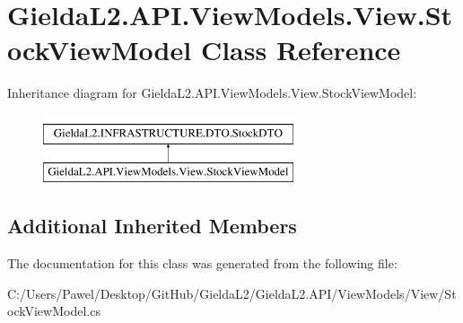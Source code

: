 \hypertarget{class_gielda_l2_1_1_a_p_i_1_1_view_models_1_1_view_1_1_stock_view_model}{}\section{Gielda\+L2.\+A\+P\+I.\+View\+Models.\+View.\+Stock\+View\+Model Class Reference}
\label{class_gielda_l2_1_1_a_p_i_1_1_view_models_1_1_view_1_1_stock_view_model}
Inheritance diagram for Gielda\+L2.\+A\+P\+I.\+View\+Models.\+View.\+Stock\+View\+Model\+:\begin{figure}[H]
\begin{center}
\leavevmode
\includegraphics[height=2.000000cm]{class_gielda_l2_1_1_a_p_i_1_1_view_models_1_1_view_1_1_stock_view_model}
\end{center}
\end{figure}
\subsection*{Additional Inherited Members}


The documentation for this class was generated from the following file\+:\begin{DoxyCompactItemize}
\item 
C\+:/\+Users/\+Pawel/\+Desktop/\+Git\+Hub/\+Gielda\+L2/\+Gielda\+L2.\+A\+P\+I/\+View\+Models/\+View/Stock\+View\+Model.\+cs\end{DoxyCompactItemize}
